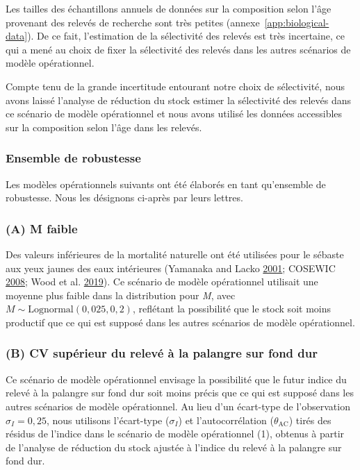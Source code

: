 \documentclass[11pt]{book}
\begin{document}
Les tailles des échantillons annuels de données sur la composition selon l'âge provenant des relevés de recherche sont très petites (annexe~\ref{app:biological-data}). De ce fait, l'estimation de la sélectivité des relevés est très incertaine, ce qui a mené au choix de fixer la sélectivité des relevés dans les autres scénarios de modèle opérationnel.

Compte tenu de la grande incertitude entourant notre choix de sélectivité, nous avons laissé l'analyse de réduction du stock estimer la sélectivité des relevés dans ce scénario de modèle opérationnel et nous avons utilisé les données accessibles sur la composition selon l'âge dans les relevés.

\hypertarget{sec:approach3-robustness}{%
\subsubsection{Ensemble de robustesse}\label{sec:approach3-robustness}}

Les modèles opérationnels suivants ont été élaborés en tant qu'ensemble de robustesse. Nous les désignons ci-après par leurs lettres.

\hypertarget{sec:approach3-referenceA}{%
\subsubsection{(A) M faible}\label{sec:approach3-referenceA}}

Des valeurs inférieures de la mortalité naturelle ont été utilisées pour le sébaste aux yeux jaunes des eaux intérieures (Yamanaka and Lacko \protect\hyperlink{ref-yamanaka2001}{2001}; COSEWIC \protect\hyperlink{ref-cosewic2008}{2008}; Wood et al. \protect\hyperlink{ref-wood2019}{2019}). Ce scénario de modèle opérationnel utilisait une moyenne plus faible dans la distribution pour \emph{M}, avec \(M \sim \textrm{Lognormal}(0,025, 0,2)\), reflétant la possibilité que le stock soit moins productif que ce qui est supposé dans les autres scénarios de modèle opérationnel.

\hypertarget{sec:approach3-referenceB}{%
\subsubsection{(B) CV supérieur du relevé à la palangre sur fond dur}\label{sec:approach3-referenceB}}

Ce scénario de modèle opérationnel envisage la possibilité que le futur indice du relevé à la palangre sur fond dur soit moins précis que ce qui est supposé dans les autres scénarios de modèle opérationnel. Au lieu d'un écart-type de l'observation \(\sigma_I = 0,25\), nous utilisons l'écart-type (\(\sigma_I\)) et l'autocorrélation (\(\theta_\textrm{AC}\)) tirés des résidus de l'indice dans le scénario de modèle opérationnel (1), obtenus à partir de l'analyse de réduction du stock ajustée à l'indice du relevé à la palangre sur fond dur.
\end{document}
